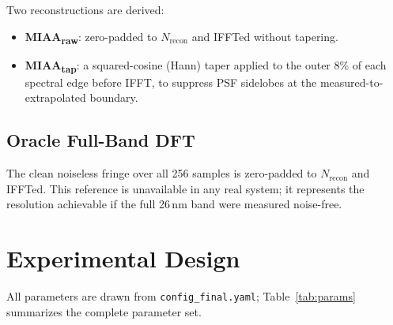 \documentclass[conference]{IEEEtran}
\begin{document}
Two reconstructions are derived:
\begin{itemize}
  \item \textbf{MIAA\textsubscript{raw}}: zero-padded to $N_\text{recon}$
    and IFFTed without tapering.
  \item \textbf{MIAA\textsubscript{tap}}: a squared-cosine (Hann) taper
    applied to the outer 8\% of each spectral edge before IFFT, to
    suppress PSF sidelobes at the measured-to-extrapolated boundary.
\end{itemize}

\subsection{Oracle Full-Band DFT}

The clean noiseless fringe over all 256 samples is zero-padded to
$N_\text{recon}$ and IFFTed. This reference is unavailable in any real
system; it represents the resolution achievable if the full 26\,nm
band were measured noise-free.

\section{Experimental Design}
\label{sec:design}

All parameters are drawn from \texttt{config\_final.yaml};
Table~\ref{tab:params} summarizes the complete parameter set.
\end{document}
